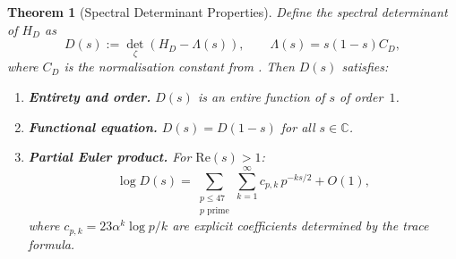 \documentclass[11pt,a4paper]{article}
\theoremstyle{plain}
\newtheorem{theorem}{Theorem}[section]
\theoremstyle{remark}
\newcommand{\C}{\mathbb{C}}
\begin{document}
\begin{theorem}[Spectral Determinant Properties]\label{thm:spectral-det}
Define the \emph{spectral determinant} of $H_D$ as
\begin{equation}\label{eq:D-def}
  D(s):=\det_\zeta(H_D-\Lambda(s)),\qquad\Lambda(s)=s(1-s)C_D,
\end{equation}
where $C_D$ is the normalisation constant from .
Then $D(s)$ satisfies:
\begin{enumerate}[nosep,label=(\alph*)]
  \item \textbf{Entirety and order.}  $D(s)$ is an entire function of $s$
        of order~$1$.
  \item \textbf{Functional equation.}  $D(s)=D(1-s)$ for all $s\in\C$.
  \item \textbf{Partial Euler product.}  For $\mathrm{Re}(s)>1$:
        \begin{equation}\label{eq:euler-product}
          \log D(s)=\sum_{\substack{p\leq 47\\p\text{ prime}}}
          \sum_{k=1}^\infty c_{p,k}\,p^{-ks/2}+O(1),
        \end{equation}
        where $c_{p,k}=23\alpha^k\log p/k$ are explicit coefficients
        determined by the trace formula.
\end{enumerate}
\end{theorem}
\end{document}
